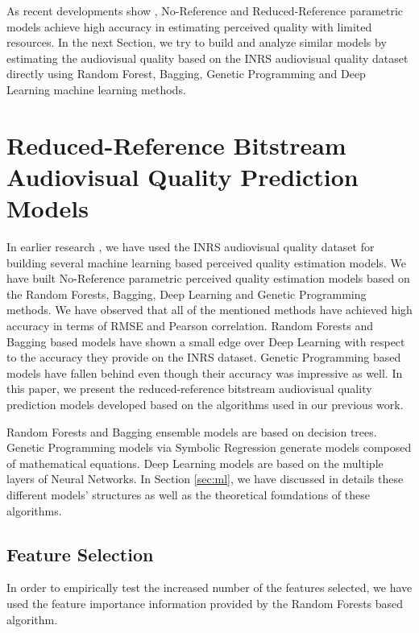 \documentclass[journal]{IEEEtran}
\begin{document}
As recent developments show \cite{maki2013reduced}  \cite{raake2011ip} \cite{garcia2014parametric} \cite{belmudez2015audiovisual} \cite{gastaldo2013supporting} \cite{goudarzi2010audiovisual}, No-Reference and Reduced-Reference parametric models achieve high accuracy in estimating perceived quality with limited resources. In the next Section, we try to build and analyze similar models by estimating the audiovisual quality based on the INRS audiovisual quality dataset directly using Random Forest, Bagging, Genetic Programming and Deep Learning machine learning methods.

\section{Reduced-Reference Bitstream Audiovisual Quality Prediction Models}
\label{sec:bitstreammodels}

In earlier research \cite{demirbilek2017parametricmodels}, we have used the INRS audiovisual quality dataset for building several machine learning based perceived quality estimation models. We have built No-Reference parametric perceived quality estimation models based on the Random Forests, Bagging, Deep Learning and Genetic Programming methods. We have observed that all of the mentioned methods have achieved high accuracy in terms of RMSE and Pearson correlation. Random Forests and Bagging based models have shown a small edge over Deep Learning with respect to the accuracy they provide on the INRS dataset. Genetic Programming based models have fallen behind even though their accuracy was impressive as well. In this paper, we present the reduced-reference bitstream audiovisual quality prediction models developed based on the algorithms used in our previous work. 

Random Forests and Bagging ensemble models are based on decision trees. Genetic Programming models via Symbolic Regression generate models composed of mathematical equations. Deep Learning models are based on the multiple layers of Neural Networks. In Section \ref{sec:ml}, we have discussed in details these different models' structures as well as the theoretical foundations of these algorithms.

\subsection{Feature Selection}

In order to empirically test the increased number of the features selected, we have used the feature importance information provided by the Random Forests based algorithm. 
\end{document}
